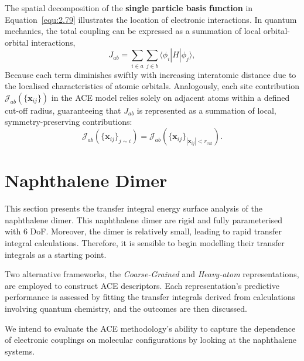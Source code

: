  The spatial decomposition of the \textbf{single particle basis function} in Equation~\eqref{equ:2.79} illustrates the location of electronic interactions.  
 In quantum mechanics, the total coupling can be expressed as a summation of local orbital-orbital interactions, 
 \begin{equation} 
 \label{equ:18}
 J_{ab} = \sum_{i \in a} \sum_{j \in b} \langle \phi_i | \hat{H} | \phi_j \rangle, 
 \end{equation}
 Because each term diminishes swiftly with increasing interatomic distance due to the localised characteristics of atomic orbitals.  
 Analogously, each site contribution \(\mathcal{J}_{ab}(\{\mathbf{x}_{ij}\})\) in the ACE model relies solely on adjacent atoms within a defined cut-off radius, guaranteeing that \(J_{ab}\) is represented as a summation of local, symmetry-preserving contributions:
\begin{equation} 
\label{equ:19}  
\mathcal{J}_{ab}\!\left(\{\mathbf{x}_{ij}\}_{j \sim i}\right) = \mathcal{J}_{ab}\!\left(\{\mathbf{x}_{ij}\}_{|\mathbf{x}_{ij}| < r_\mathrm{cut}}\right).
\end{equation} 

\section{Naphthalene Dimer} \label{sec:4.2}

This section presents the transfer integral energy surface analysis of the naphthalene dimer. This naphthalene dimer are rigid and fully parameterised with 6 DoF. Moreover, the dimer is relatively small, leading to rapid transfer integral calculations. Therefore, it is sensible to begin modelling their transfer integrals as a starting point.

Two alternative frameworks, the \textit{Coarse-Grained} and \textit{Heavy-atom} representations, are employed to construct ACE descriptors. 
Each representation's predictive performance is assessed by fitting the transfer integrals derived from calculations involving quantum chemistry, and the outcomes are then discussed.

We intend to evaluate the ACE methodology's ability to capture the dependence of electronic couplings on molecular configurations by looking at the naphthalene systems.

